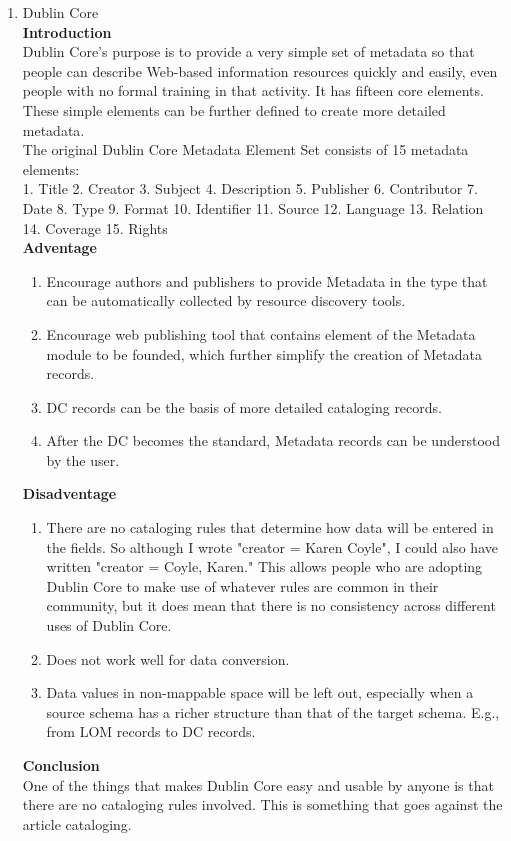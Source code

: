 \begin{enumerate}
	\item Dublin Core\\
	{\bf Introduction}\\
	Dublin Core's purpose is to provide a very simple set of metadata so   that people can describe Web-based information resources quickly and easily, even people with no formal training in that activity. It has fifteen core elements. These simple elements can be further defined to create more detailed metadata.\\
	The original Dublin Core Metadata Element Set consists of 15 metadata elements:\\
	1. Title 2. Creator 3. Subject 4. Description 5. Publisher 
	6. Contributor 7. Date 8. Type 9. Format 10. Identifier
	11. Source 12. Language 13. Relation 14. Coverage 15. Rights\\
	{\bf Adventage}
	\begin{enumerate}
		\item Encourage authors and publishers to provide Metadata in the type that can be automatically collected by resource discovery tools.
		\item Encourage web publishing tool that contains element of the Metadata module to be founded, which further simplify the creation of Metadata records.
		\item DC records can be the basis of more detailed cataloging records.
		\item After the DC becomes the standard, Metadata records can be understood by the user.
	\end{enumerate}	
	{\bf Disadventage}
	\begin{enumerate}
		\item There are no cataloging rules that determine how data will be entered in the fields. So although I wrote "creator = Karen Coyle", I could also have written "creator = Coyle, Karen." This allows people who are adopting Dublin Core to make use of whatever rules are common in their community, but it does mean that there is no consistency across different uses of Dublin Core.
		\item Does not work well for data conversion.
		\item Data values in non-mappable space will be left out, especially when a source schema has a richer structure than that of the target schema. E.g., from LOM records to DC records.
	\end{enumerate}
	{\bf Conclusion}\\
	One of the things that makes Dublin Core easy and usable by anyone is that there are no cataloging rules involved. This is something that goes against the article cataloging.
	
	
\end{enumerate}



